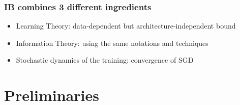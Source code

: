 \documentclass{beamer}
\begin{document}

\begin{frame}
    \frametitle{IB combines 3 different ingredients}
    \begin{itemize}
        \item Learning Theory: data-dependent but architecture-independent bound 
        \item Information Theory: using the same notations and techniques
        \item Stochastic dynamics of the training: convergence of SGD
    \end{itemize}
\end{frame}


\section{Preliminaries}
\end{document}

